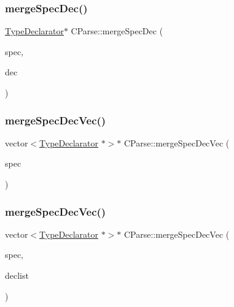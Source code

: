 \subsubsection{\texorpdfstring{mergeSpecDec()}{mergeSpecDec()}\hspace{0.1cm}{\footnotesize\ttfamily [2/2]}}
{\footnotesize\ttfamily \mbox{\hyperlink{class_type_declarator}{Type\+Declarator}}$\ast$ C\+Parse\+::merge\+Spec\+Dec (\begin{DoxyParamCaption}\item[{\mbox{\hyperlink{struct_type_specifiers}{Type\+Specifiers}} $\ast$}]{spec,  }\item[{\mbox{\hyperlink{class_type_declarator}{Type\+Declarator}} $\ast$}]{dec }\end{DoxyParamCaption})}

\mbox{\label{class_c_parse_affe40bb9253984787da05af88523d256}} 
\subsubsection{\texorpdfstring{mergeSpecDecVec()}{mergeSpecDecVec()}\hspace{0.1cm}{\footnotesize\ttfamily [1/2]}}
{\footnotesize\ttfamily vector$<$\mbox{\hyperlink{class_type_declarator}{Type\+Declarator}} $\ast$$>$$\ast$ C\+Parse\+::merge\+Spec\+Dec\+Vec (\begin{DoxyParamCaption}\item[{\mbox{\hyperlink{struct_type_specifiers}{Type\+Specifiers}} $\ast$}]{spec }\end{DoxyParamCaption})}

\mbox{\label{class_c_parse_afaf4be69d1d31f3e1f391aad486f2f3f}} 
\subsubsection{\texorpdfstring{mergeSpecDecVec()}{mergeSpecDecVec()}\hspace{0.1cm}{\footnotesize\ttfamily [2/2]}}
{\footnotesize\ttfamily vector$<$\mbox{\hyperlink{class_type_declarator}{Type\+Declarator}} $\ast$$>$$\ast$ C\+Parse\+::merge\+Spec\+Dec\+Vec (\begin{DoxyParamCaption}\item[{\mbox{\hyperlink{struct_type_specifiers}{Type\+Specifiers}} $\ast$}]{spec,  }\item[{vector$<$ \mbox{\hyperlink{class_type_declarator}{Type\+Declarator}} $\ast$ $>$ $\ast$}]{declist }\end{DoxyParamCaption})}

